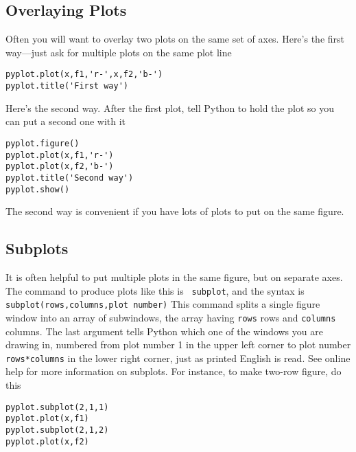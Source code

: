 \subsection*{Overlaying Plots}
  Often you will want to
overlay two plots on the same set of axes.
Here's the first way---just ask for multiple plots on the
same plot line
\begin{Verbatim}
pyplot.plot(x,f1,'r-',x,f2,'b-')
pyplot.title('First way')
\end{Verbatim}
Here's the second way. After the first plot, tell Python
to hold the plot so you can put a second one with it
\begin{Verbatim}
pyplot.figure()
pyplot.plot(x,f1,'r-')
pyplot.plot(x,f2,'b-')
pyplot.title('Second way')
pyplot.show()
\end{Verbatim}
The second way is convenient if you have lots of plots to put on
the same figure.  

\subsection*{Subplots}

It is often helpful to put multiple plots in the same figure, but
on separate axes. The command to produce plots like this is {\tt
subplot}, and the syntax is \texttt{subplot(rows,columns,plot
number)} This command splits a single figure window into an array
of subwindows, the array having {\tt rows} rows and {\tt columns}
columns. The last argument tells Python which one of the windows
you are drawing in, numbered from plot number 1 in the upper left
corner to plot number {\tt rows*columns} in the lower right corner,
just as printed English is read. See online help for more
information on subplots.  For instance, to make two-row figure, do
this
\begin{Verbatim}
pyplot.subplot(2,1,1)
pyplot.plot(x,f1)
pyplot.subplot(2,1,2)
pyplot.plot(x,f2)
\end{Verbatim}



